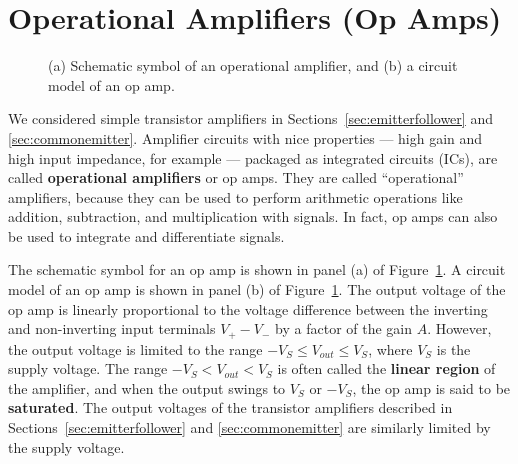 \documentclass[11pt]{article}
\begin{document}
\newpage

\section{Operational Amplifiers (Op Amps)}
\label{sec:opamps}

\begin{figure}[ht]
  \begin{center}
    \caption{(a) Schematic symbol of an operational amplifier, and
      (b) a circuit model of an op amp.}
    \label{fig:opampmodel}
  \end{center}
\end{figure}

We considered simple transistor amplifiers in
Sections~\ref{sec:emitterfollower} and \ref{sec:commonemitter}.
Amplifier circuits with nice properties --- high gain and 
high input impedance, for example --- packaged as integrated circuits
(ICs), are called \textbf{operational amplifiers} or op amps. They are
called ``operational'' amplifiers, because they can be used to perform
arithmetic operations like addition, subtraction, and multiplication
with signals. In fact, op amps can also be used to integrate and
differentiate signals.

The schematic symbol for an op amp is shown in panel (a)
of Figure~\ref{fig:opampmodel}. A circuit model of an op amp is shown
in panel (b) of Figure~\ref{fig:opampmodel}. The output voltage of the
op amp is linearly proportional to the voltage difference between the
inverting and non-inverting input terminals $V_+ - V_-$ by a factor of
the gain $A$. However, the output voltage is limited to the range
$-V_S \leq V_{out} \leq V_S$, where $V_S$ is the supply voltage. The
range $-V_S < V_{out} < V_S$ is often called the \textbf{linear region}
of the amplifier, and when the output swings to $V_S$ or $-V_S$, the
op amp is said to be \textbf{saturated}. The output voltages of the
transistor amplifiers described in Sections~\ref{sec:emitterfollower} and
\ref{sec:commonemitter} are similarly limited by the supply voltage.
\end{document}
